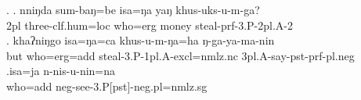  \ex. \ag. nniŋda  sum-baŋ=be          isa=ŋa   yaŋ  khus-uks-u-m-ga?\\
 	{\sc 2pl} three{\sc -clf.hum=loc} who{\sc =erg} money steal{\sc [pst]-prf-3.P-2pl.A-2}\\
 	\bg. khaʔniŋgo isa=ŋa=ca      khus-u-m-ŋa=ha ŋ-ga-ya-ma-nin\\
 	but who{\sc =erg=add} steal{\sc [pst]-3.P-1pl.A-excl=nmlz.nc} {\sc 3pl.A-}say{\sc -pst-prf-pl.neg}\\
 	 
\bg.isa=ja n-nis-u-nin=na\\
who{\sc =add} {\sc neg-}see{\sc -3.P[pst]-neg.pl=nmlz.sg}\\
 







